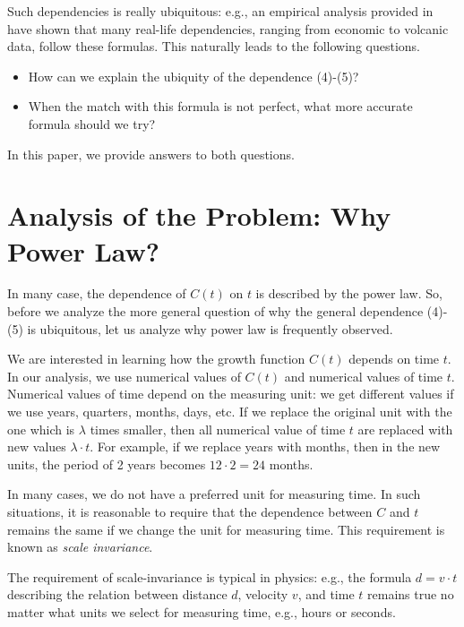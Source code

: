 \documentclass{article}
\begin{document}
Such dependencies is really ubiquitous: e.g., an empirical analysis provided in \cite{Mariani 2020} have shown that
many real-life dependencies, ranging from economic to volcanic data, follow these formulas. This naturally
leads to the following questions.
\medskip
\newpage

\begin{itemize}
\item How can we explain the ubiquity of the dependence (4)-(5)?
\item When the match with this formula is not perfect, what more accurate formula should we try?
\end{itemize}
In this paper, we provide answers to both questions.

\section{Analysis of the Problem: Why Power Law?}

 In many case, the dependence of $C(t)$ on $t$ is described by the power law.
So, before we analyze the more general question of why the general dependence (4)-(5) is ubiquitous,
let us analyze why power law is frequently observed.
\medskip

 We are interested in learning how the growth function $C(t)$ depends on time $t$.
In our analysis, we use numerical values of $C(t)$ and numerical values of time $t$. Numerical values of time
depend on the measuring unit: we get different values if we use years, quarters, months, days, etc. If we replace
the original unit with the one which is $\lambda$ times smaller, then all numerical value of time $t$ are replaced
with new values $\lambda\cdot t$. For example, if we replace years with months, then in the new units, the period of 2 years
becomes $12\cdot 2=24$ months.

In many cases, we do not have a preferred unit for measuring time. In such situations, it is reasonable to
require that the dependence between $C$ and $t$ remains the same if we change the unit for measuring time.
This requirement is known as {\it scale invariance}.

The requirement of scale-invariance is typical in physics: e.g., the formula $d=v\cdot t$ describing the relation between
distance $d$, velocity $v$, and time $t$ remains true no matter what units we select for measuring time, e.g., hours or seconds.
\end{document}
